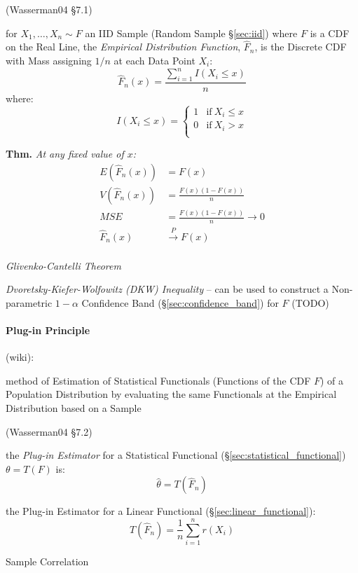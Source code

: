 (Wasserman04 \S7.1)

for $X_1, \ldots, X_n \sim F$ an IID Sample (Random Sample \S\ref{sec:iid})
where $F$ is a CDF on the Real Line, the \emph{Empirical Distribution Function},
$\hat{F}_n$, is the Discrete CDF with Mass assigning $1/n$ at each Data Point
$X_i$:
\[
  \hat{F}_n(x) = \frac{\sum_{i=1}^n I(X_i \leq x)}{n}
\]
where:
\[
  I(X_i \leq x) = \begin{cases}
    1 & \text{if}\ X_i \leq x \\
    0 & \text{if}\ X_i > x \\
  \end{cases}
\]

\textbf{Thm.} \emph{
  At any fixed value of $x$:
  \begin{align*}
    E(\hat{F}_n(x)) & = F(x)                     \\
    V(\hat{F}_n(x)) & = \frac{F(x)(1 - F(x))}{n} \\
    MSE & = \frac{F(x)(1-F(x))}{n} \rightarrow 0 \\
    \hat{F}_n(x) & \xrightarrow{P} F(x)          \\
  \end{align*}
}

\emph{Glivenko-Cantelli Theorem}

\emph{Dvoretsky-Kiefer-Wolfowitz (DKW) Inequality} -- can be used to construct a
Non-parametric $1-\alpha$ Confidence Band (\S\ref{sec:confidence_band}) for $F$
(TODO)



\paragraph{Plug-in Principle}\label{sec:plugin_principle}\hfill

(wiki):

method of Estimation of Statistical Functionals (Functions of the CDF $F$) of a
Population Distribution by evaluating the same Functionals at the Empirical
Distribution based on a Sample

(Wasserman04 \S7.2)

the \emph{Plug-in Estimator} for a Statistical Functional
(\S\ref{sec:statistical_functional}) $\theta = T(F)$ is:
\[
  \hat{\theta} = T(\hat{F}_n)
\]

the Plug-in Estimator for a Linear Functional (\S\ref{sec:linear_functional}):
\[
  T(\hat{F}_n) = \frac{1}{n}\sum_{i=1}^n r(X_i)
\]

Sample Correlation

